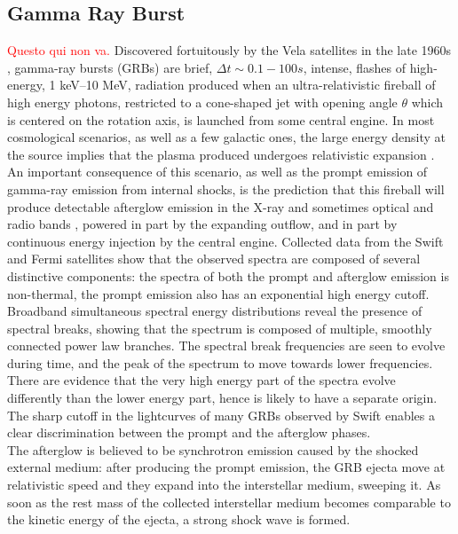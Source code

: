 \documentclass[binding=0.6cm, LaM]{sapthesis}
\newcommand{\fpg}[1]{\textcolor{red}{#1} }
\begin{document}
\subsection{Gamma Ray Burst}
\fpg{Questo qui non va.}
	Discovered fortuitously by the Vela satellites in the late 1960s \cite{180},
        gamma-ray bursts (GRBs) are brief, $\Delta t \sim 0.1-100s$, intense, flashes of high-energy, 1 keV–10 MeV, radiation
        produced when an ultra-relativistic fireball of high energy photons, restricted to a cone-shaped jet with opening angle $\theta$
        which is centered on the rotation axis, is launched from some central engine.
        In most cosmological scenarios, as well as a few galactic ones,
        the large energy density at the source implies that the plasma produced
        undergoes relativistic expansion \cite{181}.
        An important consequence of this scenario, as well as the prompt emission of gamma-ray emission from internal shocks,
        is the prediction that this fireball will produce detectable afterglow emission in the X-ray and sometimes optical and radio bands \cite{182},
        powered in part by the expanding outflow, and in part by continuous energy injection by the central engine.
        Collected data from the Swift and Fermi satellites show
        that the observed spectra are composed of several distinctive components:
        the spectra of both the prompt and afterglow emission is non-thermal,
        the prompt emission also has an exponential high energy cutoff.
        Broadband simultaneous spectral energy distributions
        reveal the presence of spectral breaks, showing that the spectrum is composed of multiple,
        smoothly connected power law branches.
        The spectral break frequencies are seen to evolve during time,
        and the peak of the spectrum to move towards lower frequencies.
        There are evidence that the very high energy part of the spectra evolve differently than the lower energy part,
        hence is likely to have a separate origin.
        The sharp cutoff in the lightcurves of many GRBs observed by Swift enables a clear discrimination between the prompt and the afterglow phases.  \\
        The afterglow is believed to be synchrotron emission caused by the shocked external medium: after producing the prompt emission, the GRB ejecta move at relativistic speed
        and they expand into the interstellar medium, sweeping it.
        As soon as the rest mass of the collected interstellar medium becomes comparable
        to the kinetic energy of the ejecta, a strong shock wave is formed.
\end{document}
